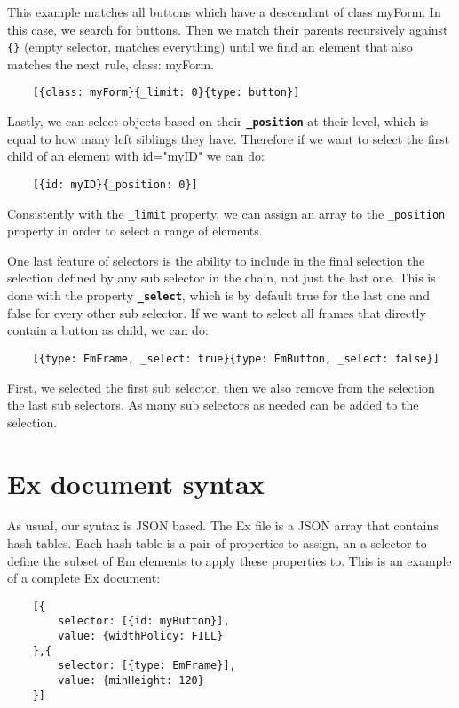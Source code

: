 This example matches all buttons which have a descendant of class myForm. In this case, we search for buttons. Then we match their parents recursively against \verb|{}| (empty selector, matches everything) until we find an element that also matches the next rule, class: myForm.
\begin{verbatim}
    [{class: myForm}{_limit: 0}{type: button}]
\end{verbatim}

Lastly, we can select objects based on their \textbf{\texttt{\_position}} at their level, which is equal to how many left siblings they have. Therefore if we want to select the first child of an element with id="myID" we can do:
\begin{verbatim}
    [{id: myID}{_position: 0}]
\end{verbatim}

Consistently with the \texttt{\_limit} property, we can assign an array to the \texttt{\_position} property in order to select a range of elements.

One last feature of selectors is the ability to include in the final selection the selection defined by any sub selector in the chain, not just the last one. This is done with the property \textbf{\texttt{\_select}}, which is by default true for the last one and false for every other sub selector. If we want to select all frames that directly contain a button as child, we can do:

\begin{verbatim}
    [{type: EmFrame, _select: true}{type: EmButton, _select: false}]
\end{verbatim}

First, we selected the first sub selector, then we also remove from the selection the last sub selectors. As many sub selectors as needed can be added to the selection.

\section{Ex document syntax}
As usual, our syntax is JSON based. The Ex file is a JSON array that contains hash tables. Each hash table is a pair of properties to assign, an a selector to define the subset of Em elements to apply these properties to. This is an example of a complete Ex document:

\begin{verbatim}
    [{
        selector: [{id: myButton}],
        value: {widthPolicy: FILL}
    },{
        selector: [{type: EmFrame}],
        value: {minHeight: 120}
    }]
\end{verbatim}

